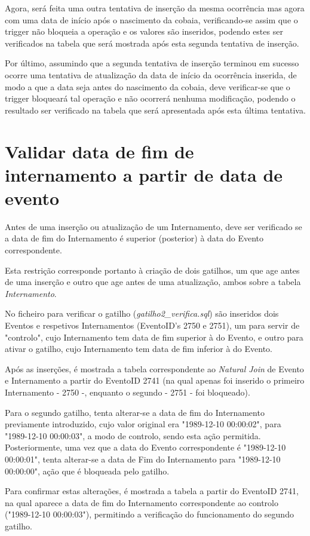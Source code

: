 \documentclass[article, a4paper, 12pt, oneside]{memoir}
\begin{document}
Agora, será feita uma outra tentativa de inserção da mesma ocorrência mas agora com uma data de início após o nascimento da cobaia, verificando-se assim que o trigger não bloqueia a operação e os valores são inseridos, podendo estes ser verificados na tabela que será mostrada após esta segunda tentativa de inserção.

Por último, assumindo que a segunda tentativa de inserção terminou em sucesso ocorre uma tentativa de atualização da data de início da ocorrência inserida, de modo a que a data seja antes do nascimento da cobaia, deve verificar-se que o trigger bloqueará tal operação e não ocorrerá nenhuma modificação, podendo o resultado ser verificado na tabela que será apresentada após esta última tentativa.

\section{Validar data de fim de internamento a partir de data de evento}
Antes de uma inserção ou atualização de um Internamento, deve ser verificado se a data de fim do Internamento é superior (posterior) à data do Evento correspondente.

Esta restrição corresponde portanto à criação de dois gatilhos, um que age antes de uma inserção e outro que age antes de uma atualização, ambos sobre a tabela \emph{Internamento}.

No ficheiro para verificar o gatilho (\textit{gatilho2\_verifica.sql}) são inseridos dois Eventos e respetivos Internamentos (EventoID's 2750 e 2751), um para servir de "controlo", cujo Internamento tem data de fim superior à do Evento, e outro para ativar o gatilho, cujo Internamento tem data de fim inferior à do Evento.

Após as inserções, é mostrada a tabela correspondente ao \textit{Natural Join} de Evento e Internamento a partir do EventoID 2741 (na qual apenas foi inserido o primeiro Internamento - 2750 -, enquanto o segundo - 2751 - foi bloqueado).

Para o segundo gatilho, tenta alterar-se a data de fim do Internamento previamente introduzido, cujo valor original era "1989-12-10 00:00:02", para "1989-12-10 00:00:03", a modo de controlo, sendo esta ação permitida. Posteriormente, uma vez que a data do Evento correspondente é "1989-12-10 00:00:01", tenta alterar-se a data de Fim do Internamento para "1989-12-10 00:00:00", ação que é bloqueada pelo gatilho.

Para confirmar estas alterações, é mostrada a tabela a partir do EventoID 2741, na qual aparece a data de fim do Internamento correspondente ao controlo ("1989-12-10 00:00:03"), permitindo a verificação do funcionamento do segundo gatilho.
\end{document}

